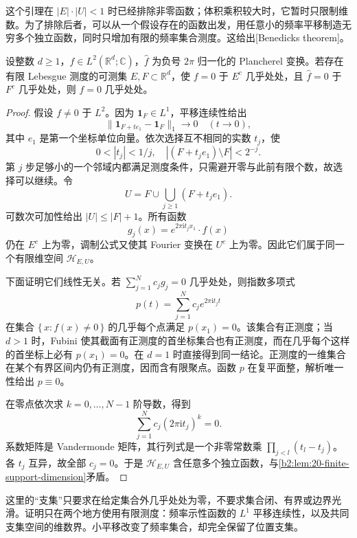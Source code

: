 这个引理在 \(|E|\cdot|U|<1\) 时已经排除非零函数；体积乘积较大时，它暂时只限制维数。为了排除后者，可以从一个假设存在的函数出发，用任意小的频率平移制造无穷多个独立函数，同时只增加有限的频率集合测度。这给出[Benedicks theorem]。

\begin{theorem}[Benedicks]\label{b2:thm:20-benedicks}
设整数 \(d\geq1\)，\(f\in L^2(\mathbb R^d;\mathbb C)\)，\(\widehat f\) 为负号 \(2\pi\) 归一化的 Plancherel 变换。若存在有限 Lebesgue 测度的可测集 \(E,F\subset\mathbb R^d\)，使 \(f=0\) 于 \(E^c\) 几乎处处，且 \(\widehat f=0\) 于 \(F^c\) 几乎处处，则 \(f=0\) 几乎处处。
\end{theorem}
\begin{proof}
假设 \(f\ne0\) 于 \(L^2\)。因为 \(\mathbf1_F\in L^1\)，平移连续性给出
\[
 \|\mathbf1_{F+te_1}-\mathbf1_F\|_1\longrightarrow0
 \quad(t\to0),
\]
其中 \(e_1\) 是第一个坐标单位向量。依次选择互不相同的实数 \(t_j\)，使
\[
 0<|t_j|<1/j,
 \quad |(F+t_je_1)\setminus F|<2^{-j}.
\]
第 \(j\) 步足够小的一个邻域内都满足测度条件，只需避开零与此前有限个数，故选择可以继续。令
\[
 U=F\cup\bigcup_{j\geq1}(F+t_je_1).
\]
可数次可加性给出 \(|U|\leq|F|+1\)。所有函数
\[
 g_j(x)=e^{2\pi\mathrm i t_jx_1}\cdot f(x)
\]
仍在 \(E^c\) 上为零，调制公式又使其 Fourier 变换在 \(U^c\) 上为零。因此它们属于同一个有限维空间 \(\mathcal H_{E,U}\)。

下面证明它们线性无关。若 \(\sum_{j=1}^N c_jg_j=0\) 几乎处处，则指数多项式
\[
 p(t)=\sum_{j=1}^Nc_j e^{2\pi\mathrm i t_jt}
\]
在集合 \(\{\,x:f(x)\ne0\,\}\) 的几乎每个点满足 \(p(x_1)=0\)。该集合有正测度；当 \(d>1\) 时，Fubini 使其截面有正测度的首坐标集合也有正测度，而在几乎每个这样的首坐标上必有 \(p(x_1)=0\)。在 \(d=1\) 时直接得到同一结论。正测度的一维集合在某个有界区间内仍有正测度，因而含有限聚点。函数 \(p\) 在复平面整，解析唯一性给出 \(p\equiv0\)。

在零点依次求 \(k=0,\ldots,N-1\) 阶导数，得到
\[
 \sum_{j=1}^Nc_j(2\pi\mathrm i t_j)^k=0.
\]
系数矩阵是 Vandermonde 矩阵，其行列式是一个非零常数乘 \(\prod_{j<l}(t_l-t_j)\)。各 \(t_j\) 互异，故全部 \(c_j=0\)。于是 \(\mathcal H_{E,U}\) 含任意多个独立函数，与\cref{b2:lem:20-finite-support-dimension}矛盾。
\end{proof}

这里的“支集”只要求在给定集合外几乎处处为零，不要求集合闭、有界或边界光滑。证明只在两个地方使用有限测度：频率示性函数的 \(L^1\) 平移连续性，以及共同支集空间的维数界。小平移改变了频率集合，却完全保留了位置支集。

